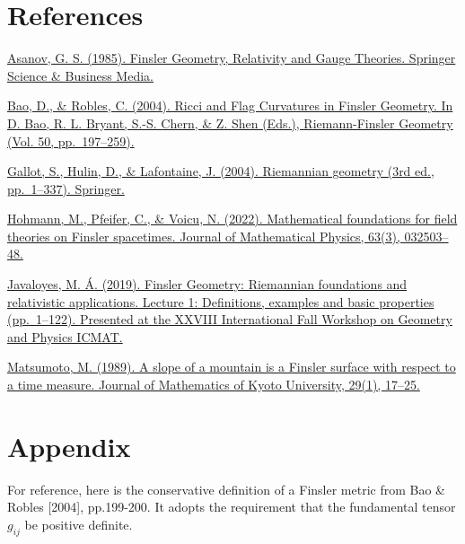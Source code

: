 \documentclass[11pt]{article}
\begin{document}
    \hypertarget{references}{%
\section*{References}\label{references}}

    \href{http://doi.org/10.1007/978-94-009-5329-1}{Asanov, G. S. (1985).
Finsler Geometry, Relativity and Gauge Theories. Springer Science \&
Business Media.}

\href{http://library.msri.org/books/Book50/contents.html}{Bao, D., \&
Robles, C. (2004). Ricci and Flag Curvatures in Finsler Geometry. In D.
Bao, R. L. Bryant, S.-S. Chern, \& Z. Shen (Eds.), Riemann-Finsler
Geometry (Vol. 50, pp.~197--259).}

\href{http://doi.org/10.1007/978-3-642-18855-8}{Gallot, S., Hulin, D.,
\& Lafontaine, J. (2004). Riemannian geometry (3rd ed., pp.~1--337).
Springer.}

\href{http://doi.org/10.1063/5.0065944}{Hohmann, M., Pfeifer, C., \&
Voicu, N. (2022). Mathematical foundations for field theories on Finsler
spacetimes. Journal of Mathematical Physics, 63(3), 032503--48.}

\href{https://www.icmat.es/congresos/2019/IFWGP/program.php}{Javaloyes,
M. Á. (2019). Finsler Geometry: Riemannian foundations and relativistic
applications. Lecture 1: Definitions, examples and basic properties
(pp.~1--122). Presented at the XXVIII International Fall Workshop on
Geometry and Physics ICMAT.}

\href{http://projecteuclid.org/download/pdf_1/euclid.kjm/1250520303}{Matsumoto,
M. (1989). A slope of a mountain is a Finsler surface with respect to a
time measure. Journal of Mathematics of Kyoto University, 29(1),
17--25.}

    \hypertarget{appendix}{%
\section*{Appendix}\label{appendix}}

    For reference, here is the conservative definition of a Finsler metric
from Bao \& Robles {[}2004{]}, pp.199-200. It adopts the requirement
that the fundamental tensor \(g_{ij}\) be positive definite.

 
            
    
    \begin{center}
    \end{center}
    { \hspace*{\fill} \\}
    
\end{document}
